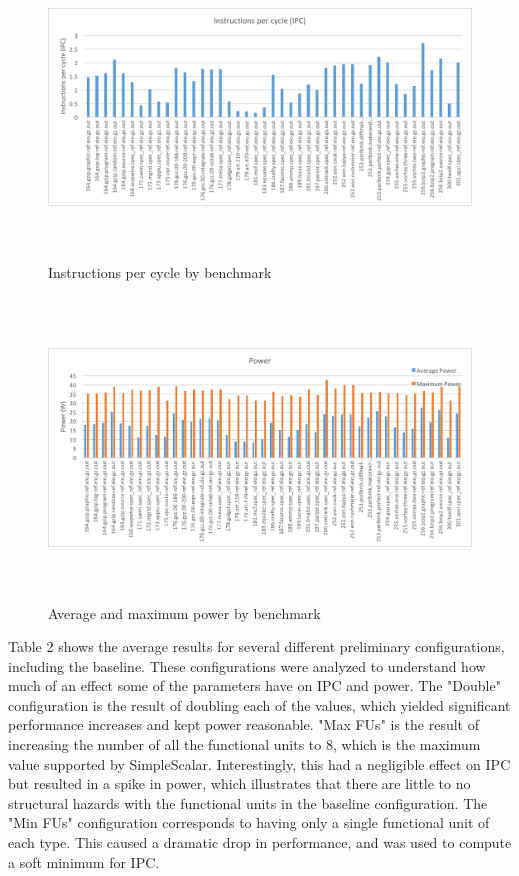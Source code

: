 \documentclass[english]{article}
\begin{document}
\begin{figure}[H]
	\centering
	\includegraphics[height=8cm]{baseline_ipc.png}
	\caption{Instructions per cycle by benchmark}
\end{figure}

\begin{figure}[H]
	\centering
	\includegraphics[height=8cm]{baseline_p.png}
	\caption{Average and maximum power by benchmark}
\end{figure}

Table 2 shows the average results for several different preliminary configurations, including the baseline. These configurations were analyzed to understand how much of an effect some of the parameters have on IPC and power. The "Double" configuration is the result of doubling each of the values, which yielded significant performance increases and kept power reasonable. "Max FUs" is the result of increasing the number of all the functional units to 8, which is the maximum value supported by SimpleScalar. Interestingly, this had a negligible effect on IPC but resulted in a spike in power, which illustrates that there are little to no structural hazards with the functional units in the baseline configuration. The "Min FUs" configuration corresponds to having only a single functional unit of each type. This caused a dramatic drop in performance, and was used to compute a soft minimum for IPC.
\end{document}
